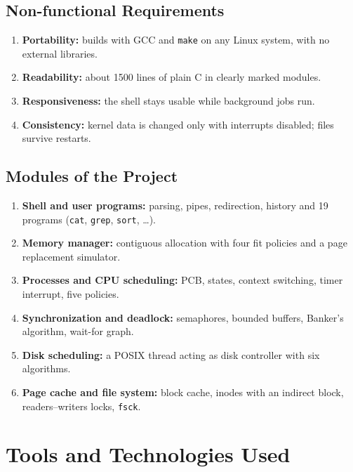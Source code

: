 \documentclass[12pt,a4paper]{article}
\begin{document}
\subsection{Non-functional Requirements}
\begin{enumerate}[label=\textbf{NFR\arabic*}, leftmargin=3.6em, itemsep=0pt, topsep=2pt]
    \item \textbf{Portability:} builds with GCC and \texttt{make} on any Linux system, with no external libraries.
    \item \textbf{Readability:} about 1500 lines of plain C in clearly marked modules.
    \item \textbf{Responsiveness:} the shell stays usable while background jobs run.
    \item \textbf{Consistency:} kernel data is changed only with interrupts disabled; files survive restarts.
\end{enumerate}

\subsection{Modules of the Project}
\begin{enumerate}[label=\textbf{M\arabic*}, leftmargin=2.8em, itemsep=0pt, topsep=2pt]
    \item \textbf{Shell and user programs:} parsing, pipes, redirection, history and 19 programs (\texttt{cat}, \texttt{grep}, \texttt{sort}, \ldots).
    \item \textbf{Memory manager:} contiguous allocation with four fit policies and a page replacement simulator.
    \item \textbf{Processes and CPU scheduling:} PCB, states, context switching, timer interrupt, five policies.
    \item \textbf{Synchronization and deadlock:} semaphores, bounded buffers, Banker's algorithm, wait-for graph.
    \item \textbf{Disk scheduling:} a POSIX thread acting as disk controller with six algorithms.
    \item \textbf{Page cache and file system:} block cache, inodes with an indirect block, readers--writers locks, \texttt{fsck}.
\end{enumerate}

\section{Tools and Technologies Used}
\end{document}
